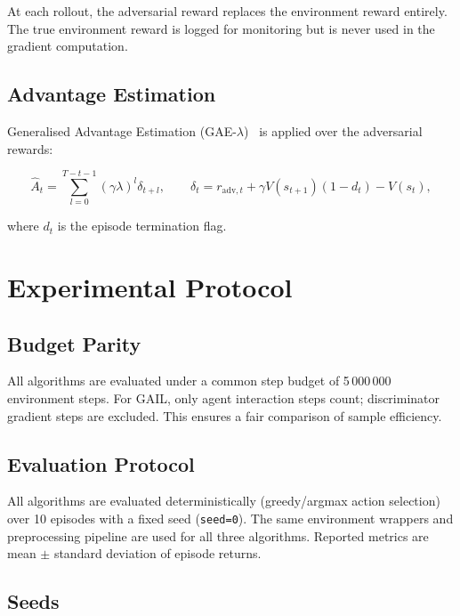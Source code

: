 \documentclass[conference]{IEEEtran}
\begin{document}
At each rollout, the adversarial reward replaces the environment reward entirely.
The true environment reward is logged for monitoring but is never used in the
gradient computation.

\subsection{Advantage Estimation}

Generalised Advantage Estimation (GAE-$\lambda$)~\cite{schulman2016gae} is applied over
the adversarial rewards:

\begin{equation}
  \hat{A}_t = \sum_{l=0}^{T-t-1} (\gamma\lambda)^l \delta_{t+l},
  \qquad
  \delta_t = r_{\text{adv},t} + \gamma V(s_{t+1})(1-d_t) - V(s_t),
\end{equation}

where $d_t$ is the episode termination flag.

\section{Experimental Protocol}
\label{sec:experiments}

\subsection{Budget Parity}

All algorithms are evaluated under a common step budget of 5\,000\,000 environment steps.
For GAIL, only agent interaction steps count; discriminator gradient steps are excluded.
This ensures a fair comparison of sample efficiency.

\subsection{Evaluation Protocol}

All algorithms are evaluated deterministically (greedy/argmax action selection) over
10 episodes with a fixed seed (\texttt{seed=0}).
The same environment wrappers and preprocessing pipeline are used for all three
algorithms.
Reported metrics are mean $\pm$ standard deviation of episode returns.

\subsection{Seeds}
\end{document}
